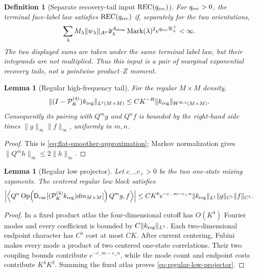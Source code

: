 \documentclass[11pt]{article}
\newtheorem{lemma}[theorem]{Lemma}
\newtheorem{definition}[theorem]{Definition}
\begin{document}
\begin{definition}[Separate recovery-tail input $\mathrm{REC}(q_{\rm rec})$]
\label{def:separate-recovery-tail}
For $q_{\rm rec}>0$, the terminal face-label law satisfies
$\mathrm{REC}(q_{\rm rec})$ if, separately for the two orientations,
\begin{equation}
\label{eq:separate-recovery-moments}
 \sum_\lambda M_\lambda\|w_\lambda\|_{\mathcal A^\alpha}
 \mathfrak d_\lambda^{A_{\rm dom}}\operatorname{Mark}(\lambda)^2
 e^{q_{\rm rec}\mathcal R_\lambda^\pm}<\infty.
\end{equation}
The two displayed sums are taken under the same terminal label law, but their
integrands are not multiplied.  Thus this input is a pair of marginal
exponential recovery tails, not a pointwise product--$Z$ moment.
\end{definition}

\begin{lemma}[Regular high-frequency tail]
\label{lem:regular-high-tail}
For the regular $M\times M$ density,
\begin{equation}
\label{eq:regular-high-tail}
 \|(I-\mathcal P_K^{(4)})k_{\rm reg}\|_{L^1(M\times M)}
 \le CK^{-R}\|k_{\rm reg}\|_{W^{R,1}(M\times M)}.
\end{equation}
Consequently its pairing with $Q^mg$ and $Q^nf$ is bounded by the right-hand
side times $\|g\|_\infty\|f\|_\infty$, uniformly in $m,n$.
\end{lemma}

\begin{proof}
This is \eqref{eq:flat-smoother-approximation}; Markov normalization gives
$\|Q^mh\|_\infty\le2\|h\|_\infty$.
\end{proof}

\begin{lemma}[Regular low projector]
\label{lem:regular-low-projector}
Let $c_-,c_+>0$ be the two one-state mixing exponents.  The centered regular
low block satisfies
\begin{equation}
\label{eq:regular-low-projector}
 \left|\left\langle Q^n\operatorname{Op}\!\left(
 \mathsf D_{\rm cur}[(\mathcal P_K^{(4)}k_{\rm reg})dm_{M\times M}]
 \right)Q^mg,f\right\rangle\right|
 \le CK^6e^{-c_-m-c_+n}\|k_{\rm reg}\|_{L^1}
       \|g\|_{C^1}\|f\|_{C^1}.
\end{equation}
\end{lemma}

\begin{proof}
In a fixed product atlas the four-dimensional cutoff has $O(K^4)$ Fourier
modes and every coefficient is bounded by $C\|k_{\rm reg}\|_{L^1}$.
Each two-dimensional endpoint character has $C^1$ cost at most $CK$.
After current centering, Fubini makes every mode a product of two centered
one-state correlations.  Their two coupling bounds contribute
$e^{-c_-m-c_+n}$, while the mode count and endpoint costs contribute
$K^4K^2$.  Summing the fixed atlas proves
\eqref{eq:regular-low-projector}.
\end{proof}
\end{document}
